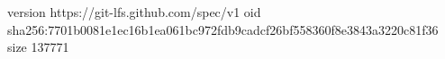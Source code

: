 version https://git-lfs.github.com/spec/v1
oid sha256:7701b0081e1ec16b1ea061bc972fdb9cadcf26bf558360f8e3843a3220c81f36
size 137771
